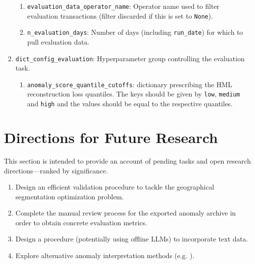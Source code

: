 \documentclass[a4paper, 10pt]{article}
\theoremstyle{plain}
\theoremstyle{definition}
\numberwithin{equation}{section}
\begin{document}
\begin{enumerate}
          \begin{enumerate}
              \item \texttt{evaluation\_data\_operator\_name}: Operator name used to filter evaluation transactions (filter discarded if this is set to \texttt{None}).
              \item \texttt{n\_evaluation\_days}: Number of days (including \texttt{run\_date}) for which to pull evaluation data.
          \end{enumerate}
    \item \texttt{dict\_config\_evaluation}: Hyperparameter group controlling the evaluation task.
          \begin{enumerate}
              \item \texttt{anomaly\_score\_quantile\_cutoffs}: dictionary prescribing the HML reconstruction loss quantiles. The keys should be given by \texttt{low}, \texttt{medium} and \texttt{high} and the values should be equal to the respective quantiles.
          \end{enumerate}
\end{enumerate}

\newpage
\section{Directions for Future Research}
This section is intended to provide an account of pending tasks and open research directions---ranked by significance.

\begin{enumerate}
    \item Design an efficient validation procedure to tackle the geographical segmentation optimization problem.
    \item Complete the manual review process for the exported anomaly archive in order to obtain concrete evaluation metrics.
    \item Design a procedure (potentially using offline LLMs) to incorporate text data.
    \item Explore alternative anomaly interpretation methods (e.g. \cite{ResExp}).
\end{enumerate}

\newpage
\nocite{*}
\typeout{}
\end{document}
